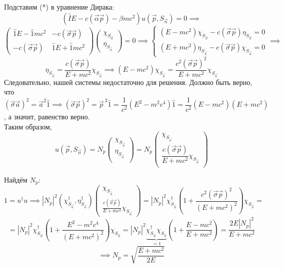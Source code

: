 Подставим (*) в уравнение Дирака:
\[
(\hat{I}E - c(\vec{\alpha}\vec{p}) - \beta mc^2) u(\vec{p}, S_{\vec{n}}) = 0 \implies
\]
\[
\begin{pmatrix} \hat{1}E - \hat{1}mc^2 & -c(\vec{\sigma}\vec{p}) \\ -c(\vec{\sigma}\vec{p}) & \hat{1}E + \hat{1}mc^2 \end{pmatrix} \begin{pmatrix} \chi_{S_{\vec{n}}} \\ \eta_{S_{\vec{n}}} \end{pmatrix} = 0 \implies
\begin{cases} (E - mc^2) \chi_{S_{\vec{n}}} - c(\vec{\sigma}\vec{p}) \eta_{S_{\vec{n}}} = 0 \\ (E + mc^2) \eta_{S_{\vec{n}}} - c(\vec{\sigma}\vec{p}) \chi_{S_{\vec{n}}} = 0 \end{cases} \implies
\]
\[
\eta_{S_{\vec{n}}} = \dfrac{c(\vec{\sigma}\vec{p})}{E + mc^2} \chi_{S_{\vec{n}}} \implies (E - mc^2) \chi_{S_{\vec{n}}} = \dfrac{c^2(\vec{\sigma}\vec{p})^2}{E + mc^2} \chi_{S_{\vec{n}}}
\]
Следовательно, нашей системы недостаточно для решения. Должно быть верно, что $(\vec{\sigma}\vec{a})^2 = \vec{a}^2\hat{1} \implies (\vec{\sigma}\vec{p})^2 = \vec{p}^{~2}\hat{1} = \dfrac{1}{c^2}(E^2 - m^2c^4)\hat{1} = \dfrac{1}{c^2}(E-mc^2)(E+mc^2)$, а значит, равенство верно.\\

Таким образом, 
\[
u(\vec{p}, S_{\vec{n}}) = N_p\begin{pmatrix}
	\chi_{S_{\vec{n}}}\\
	\eta_{S_{\vec{n}}}\\
\end{pmatrix} = N_p\begin{pmatrix}
	\chi_{S_{\vec{n}}}\\
	\dfrac{c(\vec{\sigma}\vec{p})}{E + mc^2} \chi_{S_{\vec{n}}}\\
\end{pmatrix}
\]

Найдём $N_p$:
\[
1 = u^\dagger u \implies |N_p|^2 (\chi_{S_{\vec{n}}}^\dagger, \eta_{S_{\vec{n}}}^\dagger) \begin{pmatrix} \chi_{S_{\vec{n}}} \\ \frac{c(\vec{\sigma}\vec{p})}{E + mc^2} \chi_{S_{\vec{n}}} \end{pmatrix} = |N_p|^2 \chi_{S_{\vec{n}}}^\dagger \left( 1 + \frac{c^2(\vec{\sigma}\vec{p})^2}{(E + mc^2)^2} \right) \chi_{S_{\vec{n}}} = 
\]
\[
= |N_p|^2 \chi_{S_{\vec{n}}}^\dagger \left( 1 + \frac{E^2 - m^2c^4}{(E + mc^2)^2} \right) \chi_{S_{\vec{n}}} = |N_p|^2 \underbrace{\chi_{S_{\vec{n}}}^\dagger \chi_{S_{\vec{n}}}}_{=1} \left( 1 + \frac{E - mc^2}{E + mc^2} \right) = \frac{2E |N_p|^2}{E + mc^2}
\]
\[
\implies N_p = \sqrt{\frac{E + mc^2}{2E}}
\]

